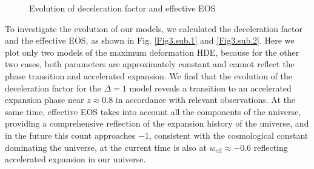 \documentclass[a4paper,fleqn]{cas-sc}
\begin{document}
\begin{figure}[htbp]
    \centering
    \caption{Evolution of deceleration factor and effective EOS}
    \label{Fig3.main}
\end{figure}

To investigate the evolution of our models, we calculated the deceleration factor and the effective EOS, as shown in Fig. \ref{Fig3.sub.1} and \ref{Fig3.sub.2}. Here we plot only two models of the maximum deformation HDE, because for the other two cases, both parameters are approximately constant and cannot reflect the phase transition and accelerated expansion. We find that the evolution of the deceleration factor for the $\Delta=1$ model reveals a transition to an accelerated expansion phase near $z \approx 0.8$ in accordance with relevant observations. At the same time, effective EOS takes into account all the components of the universe, providing a comprehensive reflection of the expansion history of the universe, and in the future this count approaches $-1$, consistent with the cosmological constant dominating the universe, at the current time is also at $w_\text{eff} \approx -0.6$ reflecting accelerated expansion in our universe.
\end{document}
